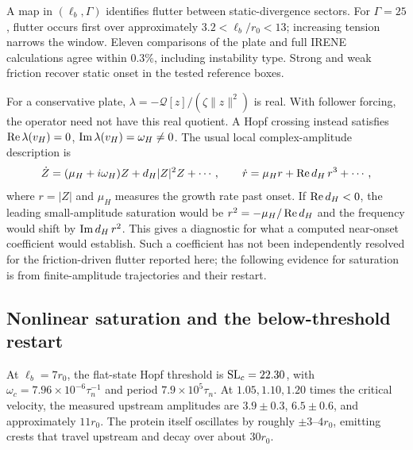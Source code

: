 A map in $(\ell_b,\Gamma)$ identifies flutter between static-divergence sectors. For $\Gamma=25$, flutter occurs first over approximately $3.2<\ell_b/r_0<13$; increasing tension narrows the window. Eleven comparisons of the plate and full IRENE calculations agree within $0.3\%$, including instability type. Strong and weak friction recover static onset in the tested reference boxes.






For a conservative plate, $\lambda=-\mathcal Q[z]/(\zeta\|z\|^2)$ is real. With follower forcing, the operator need not have this real quotient. A Hopf crossing instead satisfies $\operatorname{Re}\lambda(v_H)=0$, $\operatorname{Im}\lambda(v_H)=\omega_H\ne0$. The usual local complex-amplitude description is
\begin{equation}
\dot Z=(\mu_H+i\omega_H)Z+d_H|Z|^2Z+\cdots,
\qquad \dot r=\mu_Hr+\operatorname{Re} d_H\,r^3+\cdots,
\label{eq:flutter-normal-form}
\end{equation}
where $r=|Z|$ and $\mu_H$ measures the growth rate past onset. If $\operatorname{Re} d_H<0$, the leading small-amplitude saturation would be $r^2=-\mu_H/\operatorname{Re} d_H$ and the frequency would shift by $\operatorname{Im} d_H\,r^2$. This gives a diagnostic for what a computed near-onset coefficient would establish. Such a coefficient has not been independently resolved for the friction-driven flutter reported here; the following evidence for saturation is from finite-amplitude trajectories and their restart.

\subsection{Nonlinear saturation and the below-threshold restart}


At $\ell_b=7r_0$, the flat-state Hopf threshold is $\mathrm{SL}_c=22.30$, with $\omega_c=7.96\times10^{-6}\tau_n^{-1}$ and period $7.9\times10^5\tau_n$. At $1.05,1.10,1.20$ times the critical velocity, the measured upstream amplitudes are $3.9\pm0.3$, $6.5\pm0.6$, and approximately $11r_0$. The protein itself oscillates by roughly $\pm3$--$4r_0$, emitting crests that travel upstream and decay over about $30r_0$.

